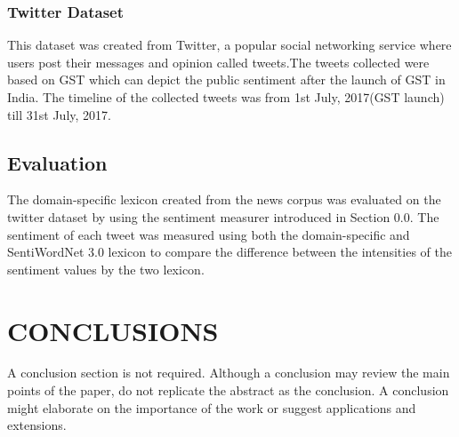 \documentclass[a4paper, 10pt, conference]{ieeeconf}      %
\begin{document}
\subsubsection{Twitter Dataset}
This dataset was created from Twitter, a popular social networking service where users post their messages and opinion called tweets.The tweets collected were based on GST which can depict the public sentiment after the launch of GST in India. The timeline of the collected tweets was from 1st July, 2017(GST launch) till 31st July, 2017.


\subsection{Evaluation}
The domain-specific lexicon created from the news corpus was evaluated on the twitter dataset by using the sentiment measurer introduced in Section 0.0. The sentiment of each tweet was measured using both the domain-specific and SentiWordNet 3.0 lexicon to compare the difference between the intensities of the sentiment values by the two lexicon.

\section{CONCLUSIONS}

A conclusion section is not required. Although a conclusion may review the main points of the paper, do not replicate the abstract as the conclusion. A conclusion might elaborate on the importance of the work or suggest applications and extensions. 

\addtolength{\textheight}{-12cm}   %







\end{document}
